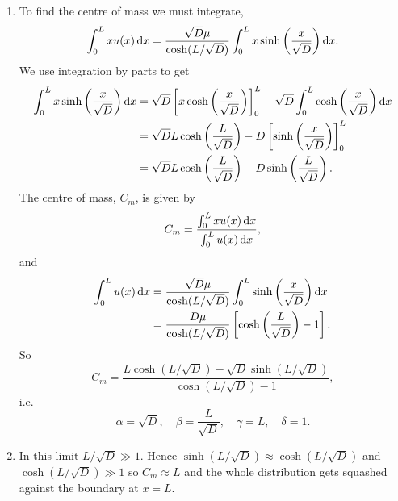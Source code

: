 \documentclass[a4paper,12pt]{article}
\begin{document}
\begin{enumerate}
{\begin{enumerate}
        \item %
          To find the centre of mass we must integrate,
          \begin{equation}
            \int_{0}^{L}x u(x) \, {\mathrm d}{x} = \frac{\sqrt{D}\mu}{\cosh(L/\sqrt{D})}\int_{0}^{L}x \sinh\left(\frac{x}{\sqrt{D}}\right) {\mathrm d}{x}.
          \end{equation}
          We use integration by parts to get
          \begin{align}
            \int_{0}^{L}x \sinh\left(\frac{x}{\sqrt{D}}\right){\mathrm d}{x} &= \sqrt{D}\left[x\cosh\left(\frac{x}{\sqrt{D}}\right)\right]_0^{L} -\sqrt{D}\int_{0}^{L} \cosh\left(\frac{x}{\sqrt{D}}\right){\mathrm d}{x}\\
            &= \sqrt{D}L\cosh\left(\frac{L}{\sqrt{D}}\right) - D\left[ \sinh\left(\frac{x}{\sqrt{D}}\right)\right]_0^{L}\\
            & =  \sqrt{D}L\cosh\left(\frac{L}{\sqrt{D}}\right) -  D \sinh\left(\frac{L}{\sqrt{D}}\right).
          \end{align}
          The centre of mass, $C_m$, is given by
          \begin{equation}
            C_m = \frac{\int_{0}^{L}x u(x) \, {\mathrm d}{x}}{\int_{0}^{L}u(x) \, {\mathrm d}{x}},
          \end{equation}
          and
          \begin{align}
            \int_{0}^{L}u(x) \, {\mathrm d}{x} & = \frac{\sqrt{D}\mu}{\cosh(L/\sqrt{D})}\int_{0}^{L}\sinh\left(\frac{x}{\sqrt{D}}\right){\mathrm d}{x} \\
            & =
            \frac{D\mu}{\cosh(L/\sqrt{D})}\left[\cosh\left(\frac{L}{\sqrt{D}}\right)-1\right].
          \end{align}
          So
          \begin{equation}
            C_m =  \frac{L\cosh(L/\sqrt{D}) -  \sqrt{D}\sinh(L/\sqrt{D})}{\cosh(L/\sqrt{D})-1},
          \end{equation}
          i.e.
          \begin{equation}
            \alpha = \sqrt{D}, \quad \beta = \frac{L}{\sqrt{D}}, \quad \gamma = L, \quad \delta = 1.
          \end{equation}


        \item %
          In this limit $L/\sqrt{D}\gg1$. Hence $\sinh(L/\sqrt{D})\approx \cosh(L/\sqrt{D})$ and $\cosh(L/\sqrt{D})\gg1$ so $C_m \approx L$ and the whole distribution gets squashed against the boundary at $x=L$.


\end{enumerate}}
\end{enumerate}
\end{document}
